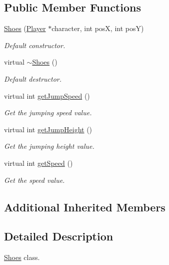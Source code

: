 \subsection*{Public Member Functions}
\begin{DoxyCompactItemize}
\item 
\hyperlink{class_shoes_a6f99c3ade2822f764a2e658ad5d97dca}{Shoes} (\hyperlink{class_player}{Player} $\ast$character, int pos\-X, int pos\-Y)
\begin{DoxyCompactList}\small\item\em Default constructor. \end{DoxyCompactList}\item 
\hypertarget{class_shoes_afc511aaebac8e7ab57286cf35db7ce8f}{virtual \hyperlink{class_shoes_afc511aaebac8e7ab57286cf35db7ce8f}{$\sim$\-Shoes} ()}\label{class_shoes_afc511aaebac8e7ab57286cf35db7ce8f}

\begin{DoxyCompactList}\small\item\em Default destructor. \end{DoxyCompactList}\item 
virtual int \hyperlink{class_shoes_a61b25a380629e60aa9996dc05a8db0df}{get\-Jump\-Speed} ()
\begin{DoxyCompactList}\small\item\em Get the jumping speed value. \end{DoxyCompactList}\item 
virtual int \hyperlink{class_shoes_a25361fa44b1f513548fe717b6befd53d}{get\-Jump\-Height} ()
\begin{DoxyCompactList}\small\item\em Get the jumping height value. \end{DoxyCompactList}\item 
virtual int \hyperlink{class_shoes_abfa031d2089d4e9397585c7a36d0490d}{get\-Speed} ()
\begin{DoxyCompactList}\small\item\em Get the speed value. \end{DoxyCompactList}\end{DoxyCompactItemize}
\subsection*{Additional Inherited Members}


\subsection{Detailed Description}
\hyperlink{class_shoes}{Shoes} class. 

